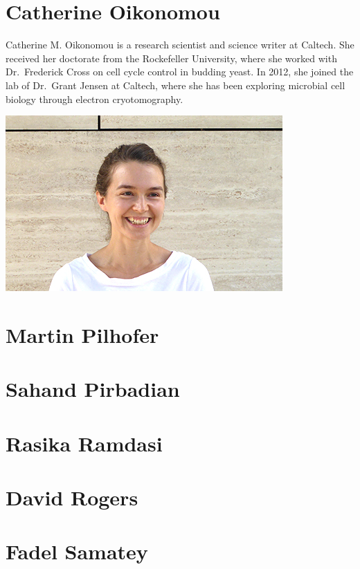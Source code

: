 \documentclass[]{tufte-book}
\begin{document}
\section{Catherine Oikonomou}\label{catherine_oikonomou}

Catherine M. Oikonomou is a research scientist and science writer at
Caltech. She received her doctorate from the Rockefeller University,
where she worked with Dr.~Frederick Cross on cell cycle control in
budding yeast. In 2012, she joined the lab of Dr.~Grant Jensen at
Caltech, where she has been exploring microbial cell biology through
electron cryotomography.

\includegraphics{img/bios/catherine_oikonomou}

\hypertarget{martin_pilhofer}{\section{Martin
Pilhofer}\label{martin_pilhofer}}

\hypertarget{sahand_pirbadian}{\section{Sahand
Pirbadian}\label{sahand_pirbadian}}

\hypertarget{rasika_ramdasi}{\section{Rasika
Ramdasi}\label{rasika_ramdasi}}

\hypertarget{david_rogers}{\section{David Rogers}\label{david_rogers}}

\hypertarget{fadel_samatey}{\section{Fadel
Samatey}\label{fadel_samatey}}
\end{document}
